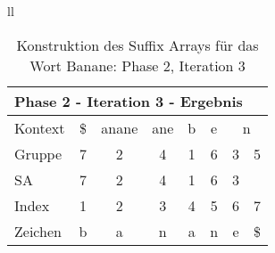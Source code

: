 \begin{table}[H]
\begin{adjustbox}{max width=\textwidth}
\begin{tabular}{ll}
\begin{tabular}{lccccccc}
\multicolumn{8}{l}{Phase 2 - Iteration 3 - Ergebnis}                                                                                                                                             \\ \hline
\multicolumn{1}{l|}{Kontext} & \multicolumn{1}{c|}{\$} & \multicolumn{1}{c|}{anane} & \multicolumn{1}{c|}{ane} & \multicolumn{1}{c|}{b} & \multicolumn{1}{c|}{e} & \multicolumn{2}{c}{n}         \\
\multicolumn{1}{l|}{Gruppe}  & \multicolumn{1}{c|}{7}  & \multicolumn{1}{c|}{2}     & \multicolumn{1}{c|}{4}   & \multicolumn{1}{c|}{1} & \multicolumn{1}{c|}{6} & 3                         & 5  \\ 
\multicolumn{1}{l|}{SA}      & \multicolumn{1}{c|}{7}  & \multicolumn{1}{c|}{2}     & \multicolumn{1}{c|}{4}   & \multicolumn{1}{c|}{1} & \multicolumn{1}{c|}{6} & \cellcolor[HTML]{\yellow}3 &    \\ \hline
\multicolumn{1}{l|}{Index}   & 1                       & 2                          & 3                        & 4                      & 5                      & 6                         & 7  \\
\multicolumn{1}{l|}{Zeichen} & b                       & a                          & n                        & a                      & n                      & e                         & \$
\end{tabular}

\end{tabular}
\end{adjustbox}

\caption[Konstruktion des Suffix Arrays für das Wort Banane: Phase 2, Iteration 3]{Konstruktion des Suffix Arrays für das Wort Banane: Phase 2, Iteration 3}
\label{fig_banane_2_3} 
\end{table}

